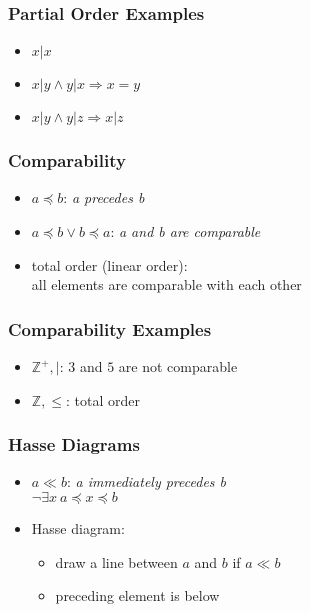 \documentclass[dvipsnames]{beamer}
\begin{document}
\begin{frame}
  \frametitle{Partial Order Examples}

  \begin{example}[$\mathbb{Z}^+$, $|$]
    \begin{itemize}
      \item $x | x$
      \item $x | y \wedge y | x \Rightarrow x = y$
      \item $x | y \wedge y | z \Rightarrow x | z$
    \end{itemize}
  \end{example}
\end{frame}

\begin{frame}
  \frametitle{Comparability}

  \begin{itemize}
    \item $a \preceq b$: \emph{a precedes b}

    \medskip
    \item $a \preceq b \vee b \preceq a$: \emph{a and b are comparable}

    \pause
    \bigskip
    \item \alert{total order} (linear order):\\
      all elements are comparable with each other
  \end{itemize}
\end{frame}

\begin{frame}
  \frametitle{Comparability Examples}

  \begin{example}
    \begin{itemize}
      \item $\mathbb{Z}^+,|$: $3$ and $5$ are not comparable

      \pause
      \medskip
      \item $\mathbb{Z},\leq$: total order
    \end{itemize}
  \end{example}
\end{frame}

\begin{frame}
  \frametitle{Hasse Diagrams}

  \begin{itemize}
    \item $a \ll b$: \emph{a immediately precedes b}\\
      $\neg \exists x~ a \preceq x \preceq b$

    \pause
    \medskip
    \item Hasse diagram:
    \begin{itemize}
      \item draw a line between $a$ and $b$ if $a \ll b$
      \item preceding element is below
    \end{itemize}
  \end{itemize}
\end{frame}
\end{document}
